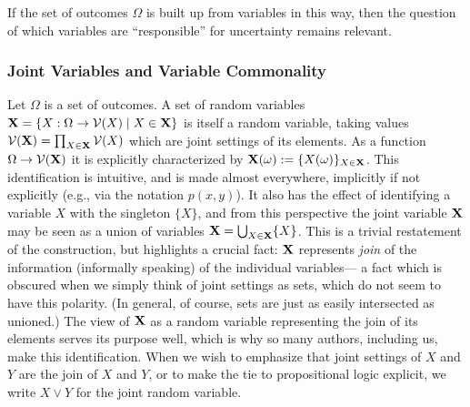 \documentclass[the-pdg-manual.tex]{subfiles}
\begin{document}
    If the set of outcomes $\Omega$ is built up from variables in this way, then the question of which variables are ``responsible'' for uncertainty remains relevant.

    \subsubsection{Joint Variables and Variable Commonality }
    Let $\Omega$ is a set of outcomes. A set of random variables $\mathbf X = \{ X : \Omega \to \mathcal V(X)  \mid X \in \mathbf X \}$ is itself a random variable, taking values $\mathcal V(\mathbf X) = \prod_{X \in \mathbf X} \mathcal V(X) $ which are joint settings of its elements. As a function $\Omega \to \mathcal V(\mathbf X)$ it is explicitly characterized by $\mathbf X(\omega) := \{ X(\omega) \}_{X \in \mathbf X}$.
    This identification is intuitive, and is made almost everywhere, implicitly if not explicitly (e.g., via the notation $p(x,y)$). It also has the effect of identifying a variable $X$ with the singleton $\{X\}$, and from this perspective the joint variable $\mathbf X$ may be seen as a union of variables $\mathbf X = \bigcup_{X \in \mathbf X} \{ X \}$.
    This is a trivial restatement of the construction, but highlights a crucial fact: $\mathbf X$ represents \emph{join} of the information (informally speaking) of the individual variables--- a fact which is obscured when we simply think of joint settings as sets, which do not seem to have this polarity. (In general, of course, sets are just as easily intersected as unioned.) The view of $\mathbf X$ as a random variable representing the join of its elements serves its purpose well, which is why so many authors, including us, make this identification. When we wish to emphasize that joint settings of $X$ and $Y$ are the join of $X$ and $Y$, or to make the tie to propositional logic explicit, we write $X \lor Y$ for the joint random variable.
\end{document}
